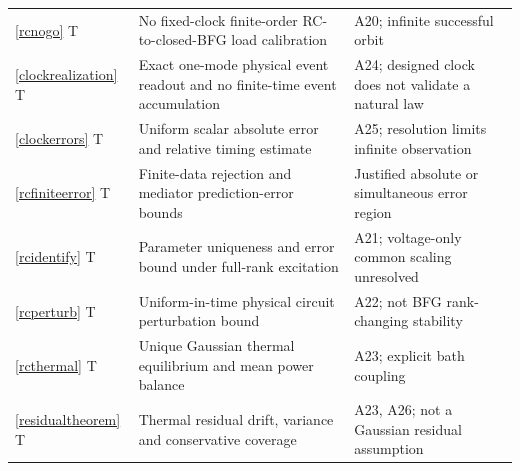 \documentclass[11pt,letterpaper]{article}
\theoremstyle{definition}
\numberwithin{equation}{section}
\begin{document}
\begin{longtable}{p{}p{}p{}}
\ref{rcnogo} T & No fixed-clock finite-order RC-to-closed-BFG load calibration & A20; infinite successful orbit\\
\ref{clockrealization} T & Exact one-mode physical event readout and no finite-time event accumulation & A24; designed clock does not validate a natural law\\
\ref{clockerrors} T & Uniform scalar absolute error and relative timing estimate & A25; resolution limits infinite observation\\
\ref{rcfiniteerror} T & Finite-data rejection and mediator prediction-error bounds & Justified absolute or simultaneous error region\\
\ref{rcidentify} T & Parameter uniqueness and error bound under full-rank excitation & A21; voltage-only common scaling unresolved\\
\ref{rcperturb} T & Uniform-in-time physical circuit perturbation bound & A22; not BFG rank-changing stability\\
\ref{rcthermal} T & Unique Gaussian thermal equilibrium and mean power balance & A23; explicit bath coupling\\
\ref{residualtheorem} T & Thermal residual drift, variance and conservative coverage & A23, A26; not a Gaussian residual assumption\\



\bottomrule
\end{longtable}

\clearpage
\end{document}

